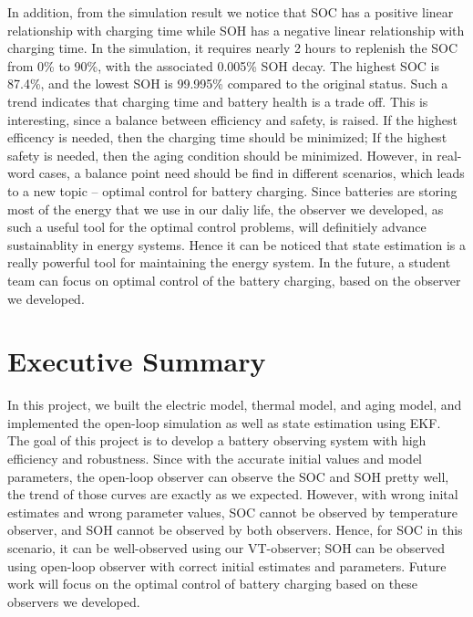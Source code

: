 \documentclass[12pt]{article}
\begin{document}
In addition, from the simulation result we notice that SOC has a positive linear relationship with charging time while SOH has a negative linear relationship with charging time. In the simulation, it requires nearly 2 hours to replenish the SOC from 0\% to 90\%, with the associated 0.005\% SOH decay. The highest SOC is 87.4\%, and the lowest SOH is 99.995\% compared to the original status. Such a trend indicates that charging time and battery health is a trade off. This is interesting, since a balance between efficiency and safety, is raised. If the highest efficency is needed, then the charging time should be minimized; If the highest safety is needed, then the aging condition should be minimized. However, in real-word cases, a balance point need should be find in different scenarios, which leads to a new topic -- optimal control for battery charging. Since batteries are storing most of the energy that we use in our daliy life, the observer we developed, as such a useful tool for the optimal control problems, will definitiely advance sustainablity in energy systems. Hence it can be noticed that state estimation is a really powerful tool for maintaining the energy system. In the future, a student team can focus on optimal control of the battery charging, based on the observer we developed.

\section*{Executive Summary}
In this project, we built the electric model, thermal model, and aging model, and implemented the open-loop simulation as well as state estimation using EKF. The goal of this project is to develop a battery observing system with high efficiency and robustness. Since with the accurate initial values and model parameters, the open-loop observer can observe the SOC and SOH pretty well, the trend of those curves are exactly as we expected. However, with wrong inital estimates and wrong parameter values, SOC cannot be observed by temperature observer, and SOH cannot be observed by both observers. Hence, for SOC in this scenario, it can be well-observed using our VT-observer; SOH can be observed using open-loop observer with correct initial estimates and parameters. Future work will focus on the optimal control of battery charging based on these observers we developed. 


\end{document}
